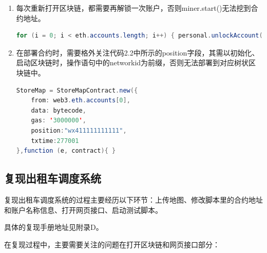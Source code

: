 \begin{enumerate}
    \item 每次重新打开区块链，都需要再解锁一次账户，否则miner.start()无法挖到合约地址。
\begin{lstlisting}[language=java, caption={解锁账户}, label={lst:unlockAccounts}]
    for (i = 0; i < eth.accounts.length; i++) { personal.unlockAccount(eth.accounts[i],"123456",0) }\end{lstlisting}
    \item 在部署合约时，需要格外关注代码2.2中所示的position字段，其需以初始化、启动区块链时，操作语句中的networkid为前缀，否则无法部署到对应树状区块链中。
\begin{lstlisting}[language=java, caption={StoreMap.sol的合约部署代码节选}, label={lst:uploadContract}]
StoreMap = StoreMapContract.new({
    from: web3.eth.accounts[0], 
    data: bytecode, 
    gas: '3000000',
    position:"wx411111111111",
    txtime:277001
},function (e, contract){ }\end{lstlisting}
    
\end{enumerate}

\subsection{复现出租车调度系统}
复现出租车调度系统的过程主要经历以下环节：上传地图、修改脚本里的合约地址和账户名称信息、打开网页接口、启动测试脚本。

具体的复现手册地址见附录D。

在复现过程中，主要需要关注的问题在打开区块链和网页接口部分：

